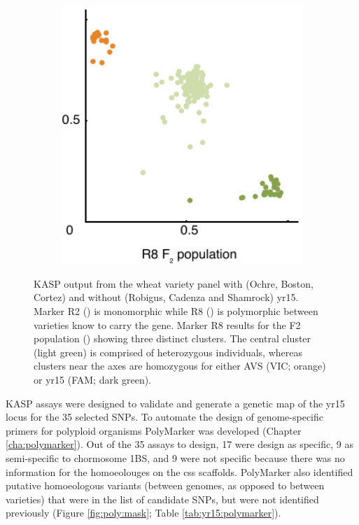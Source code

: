 \begin{figure}
\begin{subfigure}{0.31\textwidth}
\end{subfigure}
~
\begin{subfigure}{0.31\textwidth}
\caption{}
\label{fig:yr15:r8f2}
\includegraphics[width=1\textwidth]{Yr15/Figures/selection/R8f2.pdf}
\end{subfigure}

\caption{KASP output from the wheat variety panel with (Ochre, Boston, Cortez) and without (Robigus, Cadenza and Shamrock) \acrshort{yr15}. Marker  R2 () is monomorphic while R8 ()  is polymorphic between varieties know to carry the gene.  Marker R8 results for the F2 population () showing three distinct clusters. The central cluster (light green) is comprised of heterozygous individuals, whereas clusters near the axes are homozygous for either AVS (VIC; orange) or \acrshort{yr15} (FAM; dark green).}
\end{figure}

KASP assays were designed to validate and generate a genetic map of the \acrshort{yr15} locus for the 35 selected SNPs. 
To automate the design of genome-specific primers for polyploid organisms PolyMarker was developed (Chapter \ref{cha:polymarker}).
Out of the 35 assays to design, 17 were design as specific, 9 as semi-specific to chormosome 1BS, and 9 were not specific because there was no information for the homoeolouges on the \acrshort{css} scaffolds. 
PolyMarker also identified putative homoeologous variants (between genomes, as opposed to between varieties) that were in the list of candidate SNPs, but were not identified previously (Figure \ref{fig:poly:mask}; Table \ref{tab:yr15:polymarker}). 

